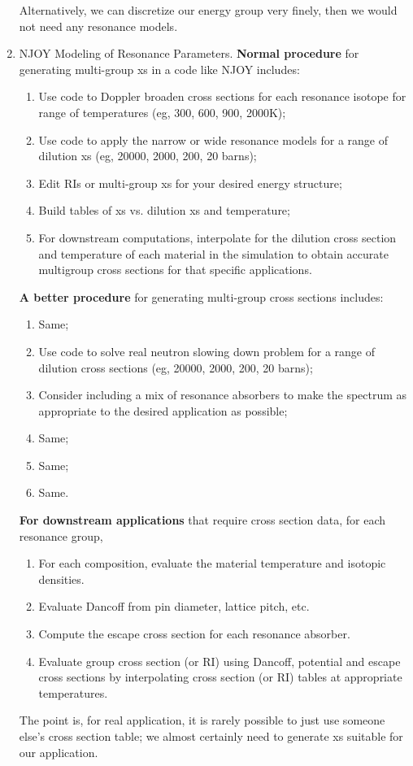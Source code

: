 \documentclass{school-22.211-notes}
\begin{document}
\begin{enumerate}
Alternatively, we can discretize our energy group very finely, then we would not need any resonance models. 



\item NJOY Modeling of Resonance Parameters. \textbf{Normal procedure} for generating multi-group xs in a code like NJOY includes:
\begin{enumerate}
\item Use code to Doppler broaden cross sections for each resonance isotope for range of temperatures (eg, 300, 600, 900, 2000K); 
\item Use code to apply the narrow or wide resonance models for a range of dilution xs (eg, 20000, 2000, 200, 20 barns); 
\item Edit RIs or multi-group xs for your desired energy structure; 
\item Build tables of xs vs. dilution xs and temperature;
\item For downstream computations, interpolate for the dilution cross section and temperature of each material in the simulation to obtain accurate multigroup cross sections for that specific applications. 
\end{enumerate}

\textbf{A better procedure} for generating multi-group cross sections includes:
\begin{enumerate}
\item Same;
\item Use code to solve real neutron slowing down problem for a range of dilution cross sections (eg, 20000, 2000, 200, 20 barns);
\item Consider including a mix of resonance absorbers to make the spectrum as appropriate to the desired application as possible;
\item Same;
\item Same;
\item Same.
\end{enumerate}

\textbf{For downstream applications} that require cross section data, for each resonance group,
\begin{enumerate}
\item For each composition, evaluate the material temperature and isotopic densities. 
\item Evaluate Dancoff from pin diameter, lattice pitch, etc. 
\item Compute the escape cross section for each resonance absorber.
\item Evaluate group cross section (or RI) using Dancoff, potential and escape cross sections by interpolating cross section (or RI) tables at appropriate temperatures. 
\end{enumerate}
The point is, for real application, it is rarely possible to just use someone else's cross section table; we almost certainly need to generate xs suitable for our application. 
\end{enumerate}
\end{document}
